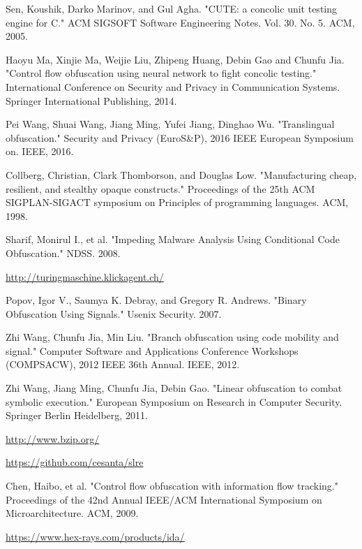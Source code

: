 \documentclass[lnicst]{svmultln}
\begin{document}
%
%
\begin{thebibliography}{5}

 Sen, Koushik, Darko Marinov, and Gul Agha. "CUTE: a concolic unit testing engine for C." ACM SIGSOFT Software Engineering Notes. Vol. 30. No. 5. ACM, 2005.

 Haoyu Ma, Xinjie Ma, Weijie Liu, Zhipeng Huang, Debin Gao and Chunfu Jia. "Control flow obfuscation using neural network to fight concolic testing." International Conference on Security and Privacy in Communication Systems. Springer International Publishing, 2014.

 Pei Wang, Shuai Wang, Jiang Ming, Yufei Jiang, Dinghao Wu. "Translingual obfuscation." Security and Privacy (EuroS\&P), 2016 IEEE European Symposium on. IEEE, 2016.

 Collberg, Christian, Clark Thomborson, and Douglas Low. "Manufacturing cheap, resilient, and stealthy opaque constructs." Proceedings of the 25th ACM SIGPLAN-SIGACT symposium on Principles of programming languages. ACM, 1998.

 Sharif, Monirul I., et al. "Impeding Malware Analysis Using Conditional Code Obfuscation." NDSS. 2008.


 \url{http://turingmaschine.klickagent.ch/}

 Popov, Igor V., Saumya K. Debray, and Gregory R. Andrews. "Binary Obfuscation Using Signals." Usenix Security. 2007.

 Zhi Wang, Chunfu Jia, Min Liu. "Branch obfuscation using code mobility and signal." Computer Software and Applications Conference Workshops (COMPSACW), 2012 IEEE 36th Annual. IEEE, 2012.

 Zhi Wang, Jiang Ming, Chunfu Jia, Debin Gao. "Linear obfuscation to combat symbolic execution." European Symposium on Research in Computer Security. Springer Berlin Heidelberg, 2011.

 \url{http://www.bzip.org/}

 \url{https://github.com/cesanta/slre}

 Chen, Haibo, et al. "Control flow obfuscation with information flow tracking." Proceedings of the 42nd Annual IEEE/ACM International Symposium on Microarchitecture. ACM, 2009.

 \url{https://www.hex-rays.com/products/ida/}


\end{thebibliography}
\end{document}
